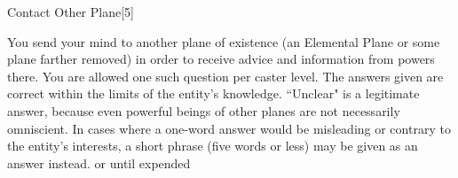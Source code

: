 \begin{spellsection}{Contact Other Plane}[5]
    \begin{spellheader}
    \end{spellheader}
    \begin{spellcontent}
        \begin{spelltargetinginfo}
        \end{spelltargetinginfo}
        \begin{spelleffects}

            \spelleffect You send your mind to another plane of existence (an Elemental Plane or some plane farther removed) in order to receive advice and information from powers there. You are allowed one such question per caster level. The answers given are correct within the limits of the entity's knowledge. ``Unclear" is a legitimate answer, because even powerful beings of other planes are not necessarily omniscient. In cases where a one-word answer would be misleading or contrary to the entity's interests, a short phrase (five words or less) may be given as an answer instead.
            \spelldur \durmed or until expended
        \end{spelleffects}
    \end{spellcontent}
    \begin{spellfooter}
    \end{spellfooter}
\end{spellsection}

